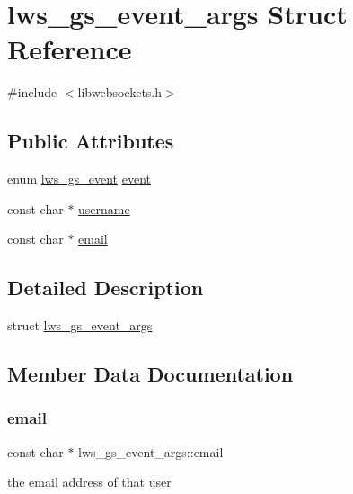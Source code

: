\hypertarget{structlws__gs__event__args}{}\section{lws\+\_\+gs\+\_\+event\+\_\+args Struct Reference}
\label{structlws__gs__event__args}


{\ttfamily \#include $<$libwebsockets.\+h$>$}

\subsection*{Public Attributes}
\begin{DoxyCompactItemize}
\item 
enum \hyperlink{group__generic-sessions_gaa93946b3d921072209d5cd8cdfa5332e}{lws\+\_\+gs\+\_\+event} \hyperlink{structlws__gs__event__args_a477274f8ca22ba7411b9285b9dc8dd06}{event}
\item 
const char $\ast$ \hyperlink{structlws__gs__event__args_ad6fa6018d274f0da0f0857b64662fc61}{username}
\item 
const char $\ast$ \hyperlink{structlws__gs__event__args_a1bfde1ec62b1e7466c169fac793032b5}{email}
\end{DoxyCompactItemize}


\subsection{Detailed Description}
struct \hyperlink{structlws__gs__event__args}{lws\+\_\+gs\+\_\+event\+\_\+args} 

\subsection{Member Data Documentation}
\mbox{\label{structlws__gs__event__args_a1bfde1ec62b1e7466c169fac793032b5}} 
\subsubsection{\texorpdfstring{email}{email}}
{\footnotesize\ttfamily const char $\ast$ lws\+\_\+gs\+\_\+event\+\_\+args\+::email}

the email address of that user \mbox{\label{structlws__gs__event__args_a477274f8ca22ba7411b9285b9dc8dd06}} 
